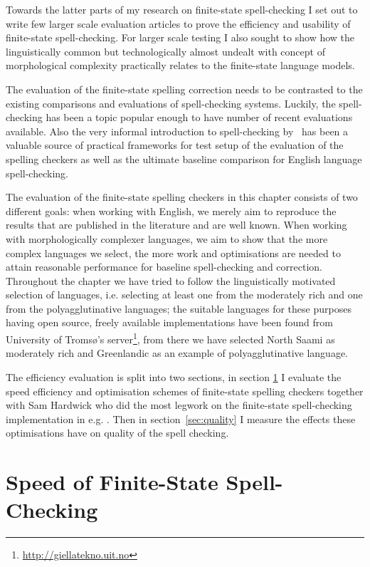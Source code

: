 \documentclass[officiallayout,draft]{unihelcompling}
\begin{document}
Towards the latter parts of my research on finite-state spell-checking I set
out to write few larger scale evaluation articles to prove the efficiency and
usability of finite-state spell-checking. For larger scale testing I also
sought to show how the linguistically common but technologically almost undealt
with concept of morphological complexity practically relates to the
finite-state language models.

The evaluation of the finite-state spelling correction needs to be contrasted
to the existing comparisons and evaluations of spell-checking systems. Luckily,
the spell-checking has been a topic popular enough to have number of recent
evaluations available.  Also the very informal introduction to spell-checking
by~\citep{norvig2010howto} has been a valuable source of practical frameworks
for test setup of the evaluation of the spelling checkers as well as the
ultimate baseline comparison for English language spell-checking.

The evaluation of the finite-state spelling checkers in this chapter consists
of two different goals: when working with English, we merely aim to reproduce
the results that are published in the literature and are well known. When
working with morphologically complexer languages, we aim to show that the more
complex languages we select, the more work and optimisations are needed to
attain reasonable performance for baseline spell-checking and correction.
Throughout the chapter we have tried to follow the linguistically motivated
selection of languages, i.e. selecting at least one from the moderately rich
and one from the polyagglutinative languages; the suitable languages for these
purposes having open source, freely available implementations have been found
from University of Tromsø's server\footnote{\url{http://giellatekno.uit.no}},
from there we have selected North Saami as moderately rich and Greenlandic as
an example of polyagglutinative language.

The efficiency evaluation is split into two sections, in section
\ref{sec:speed} I evaluate the speed efficiency and optimisation schemes of
finite-state spelling checkers together with Sam Hardwick who did the
most legwork on the finite-state spell-checking implementation in e.g.
\citep{linden2011hfst}. Then in section~\ref{sec:quality} I measure the
effects these optimisations have on quality of the spell checking.

\section{Speed of Finite-State Spell-Checking}
\label{sec:speed}
\end{document}
